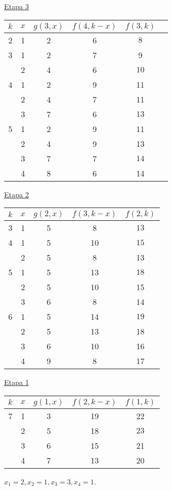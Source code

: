 \documentclass[twoside]{article}
\begin{document}
\begin{ejercicio}{4}
\begin{solucion}
\begin{center}
\end{center}
\newpage
\underline{Etapa 3}
\begin{center}
\begin{tabular}{|c|c|c|c|c|c|}
\hline
$k$ & $x$ & $g(3,x)$ & $f(4,k-x)$ & $f(3,k)$\\
\hline
2 & 1 & 2 & 6 & $\boxed{8}$\\
\hline
3 & 1 & 2 & 7 & 9\\ 
  & 2 & 4 & 6 & $\boxed{10}$\\
\hline
4 & 1 & 2 & 9 & 11\\
  & 2 & 4 & 7 & 11\\
  & 3 & 7 & 6 & $\boxed{13}$\\
  \hline
5 & 1 & 2 & 9 & 11\\
  & 2 & 4 & 9 & 13\\
  & 3 & 7 & 7 & $\boxed{14}$\\
  & 4 & 8 & 6 & 14\\
  \hline
\end{tabular}
\end{center}
\underline{Etapa 2}
\begin{center}
\begin{tabular}{|c|c|c|c|c|}
\hline
$k$ & $x$ & $g(2,x)$ & $ f(3,k-x)$ & $f(2,k)$\\
\hline 
3 & 1 & 5 & 8 & $\boxed{13}$\\
\hline
4 & 1 & 5 & 10 & $\boxed{15}$\\
  & 2 & 5 & 8 & 13\\
  \hline
5 & 1 & 5 & 13 & $\boxed{18}$\\
  & 2 & 5 & 10 & 15\\
  & 3 & 6 & 8 & 14\\
  \hline
6 & 1 & 5 & 14 & $\boxed{19}$\\
  & 2 & 5 & 13 & 18\\
  & 3 & 6 & 10 & 16\\
  & 4 & 9 & 8  & 17\\
  \hline
\end{tabular}
\end{center}
\underline{Etapa 1}
\begin{center}
\begin{tabular}{|c|c|c|c|c|}
\hline
$k$ & $x$ & $g(1,x)$ & $f(2,k-x)$ & $f(1,k)$\\
\hline
7 & 1 & 3 & 19 & 22\\
  & 2 & 5 & 18 & $\boxed{23}$\\
  & 3 & 6 & 15 & 21\\
  & 4 & 7 & 13 & 20\\
  \hline
\end{tabular}
\end{center}
$x_1=2, x_2=1, x_3=3, x_4=1$.
\end{solucion}
\end{ejercicio}
\end{document}
